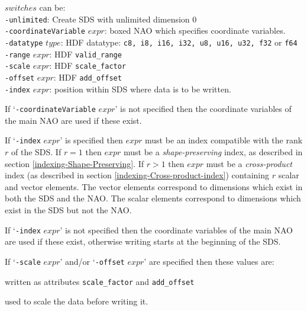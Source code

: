   $switches$ can be:
  \\
  \texttt{-unlimited}: Create SDS with unlimited dimension 0
  \\
  \texttt{-coordinateVariable} 
  $expr$: boxed NAO which specifies coordinate variables.
  \\
  \texttt{-datatype} 
  $type$: HDF datatype: 
  \texttt{c8, i8, i16, i32, u8, u16, u32, f32} or 
  \texttt{f64}
  \\
  \texttt{-range} 
  $expr$: HDF 
  \texttt{valid\_range}
  \\
  \texttt{-scale} 
  $expr$: HDF 
  \texttt{scale\_factor}
  \\
  \texttt{-offset} 
  $expr$: HDF 
  \texttt{add\_offset}
  \\
  \texttt{-index} 
  $expr$: position within SDS where data is to be written.
  

If `\texttt{-coordinateVariable} 
  $expr$' is not specified then the coordinate variables
  of the main NAO are used if these exist.
  

If `\texttt{-index} $expr$' is specified then 
  $expr$ must be an index compatible with the rank $r$ of the SDS. 
If $r = 1$ then $expr$ must be a {\em shape-preserving} index,
as described in section \ref{indexing-Shape-Preserving}.
If $r > 1$ then $expr$ must be a {\em cross-product} index
(as described in section \ref{indexing-Cross-product-index})
containing $r$ scalar and vector elements.
The vector elements
  correspond to dimensions which exist in both the SDS and the NAO. The
  scalar elements correspond to dimensions which exist in the SDS but
  not the NAO.
  

If `\texttt{-index} 
  $expr$' is not specified then the coordinate variables
  of the main NAO are used if these exist, otherwise writing starts at
  the beginning of the SDS.
  
If `\texttt{-scale} 
  $expr$' and/or `\texttt{-offset} 
  $expr$' are specified then these values are:
\begin{bullets}
    \item written as attributes \texttt{scale\_factor} and \texttt{add\_offset}
    \item used to scale the data before writing it.
\end{bullets}


